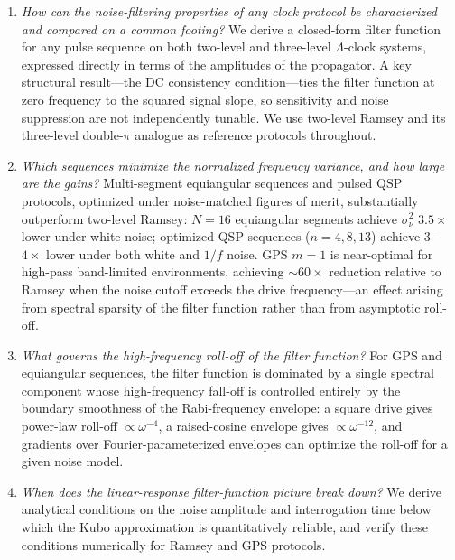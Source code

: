 \documentclass[aps,pra,twocolumn,superscriptaddress,longbibliography]{revtex4-2}
\begin{document}
\begin{enumerate}
  \item \emph{How can the noise-filtering properties of any clock protocol be characterized
        and compared on a common footing?}
        We derive a closed-form filter function for any pulse sequence on both two-level
        and three-level $\Lambda$-clock systems, expressed directly in terms of the
        amplitudes of the propagator.
        A key structural result---the DC consistency condition---ties the filter function
        at zero frequency to the squared signal slope, so sensitivity and noise
        suppression are not independently tunable.
        We use two-level Ramsey and its three-level double-$\pi$ analogue as
        reference protocols throughout.

  \item \emph{Which sequences minimize the normalized frequency variance, and how large
        are the gains?}
        Multi-segment equiangular sequences and pulsed QSP protocols, optimized under
        noise-matched figures of merit, substantially outperform two-level Ramsey:
        $N=16$ equiangular segments achieve $\sigma^2_\nu$ $3.5\times$ lower under white
        noise; optimized QSP sequences ($n=4,8,13$) achieve $3$--$4\times$ lower under
        both white and $1/f$ noise.
        GPS $m=1$ is near-optimal for high-pass band-limited environments, achieving
        $\sim60\times$ reduction relative to Ramsey when the noise cutoff exceeds
        the drive frequency---an effect arising from spectral sparsity of the filter
        function rather than from asymptotic roll-off.

  \item \emph{What governs the high-frequency roll-off of the filter function?}
        For GPS and equiangular sequences, the filter function is dominated by a single
        spectral component whose high-frequency fall-off is controlled entirely by the
        boundary smoothness of the Rabi-frequency envelope: a square drive gives
        power-law roll-off $\propto\omega^{-4}$, a raised-cosine envelope gives
        $\propto\omega^{-12}$, and gradients over Fourier-parameterized envelopes can
        optimize the roll-off for a given noise model.

  \item \emph{When does the linear-response filter-function picture break down?}
        We derive analytical conditions on the noise amplitude and interrogation time
        below which the Kubo approximation is quantitatively reliable,
        and verify these conditions numerically for Ramsey and GPS protocols.
\end{enumerate}
\end{document}
